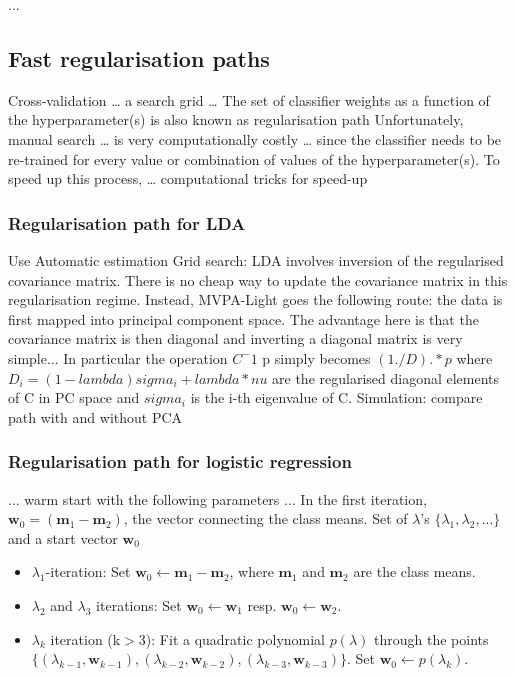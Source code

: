 \documentclass[utf8]{frontiersSCNS} %
\newcommand{\m}{\mathbf{m}}
\newcommand{\w}{\mathbf{w}}
\begin{document}
...


\subsection{Fast regularisation paths}


Cross-validation … a search grid … The set of classifier weights as a function of the hyperparameter(s) is also known as regularisation path
Unfortunately, manual search … is very computationally costly … since the classifier needs to be re-trained for every value or combination of values of the hyperparameter(s). To speed up this process, … computational tricks for speed-up

\subsubsection{Regularisation path for LDA}
Use Automatic estimation
Grid search: LDA involves inversion of the regularised covariance matrix. There is no cheap way to update the covariance matrix in this regularisation regime. Instead, MVPA-Light goes the following route: the data is first mapped into principal component space. The advantage here is that the covariance matrix is then diagonal and inverting a diagonal matrix is very simple... In particular the operation $C^-1$ p simply becomes $(1./D) .* p$ where $D_i = (1-lambda) sigma_i + lambda * nu$ are the regularised diagonal elements of C in PC space and $sigma_i$ is the i-th eigenvalue of C.
Simulation: compare path with and without PCA

\subsubsection{Regularisation path for logistic regression}

... warm start with the following parameters ... In the first iteration, $\w_0 = (\m_1 - \m_2)$, the vector connecting the class means. Set of $\lambda$'s $\{\lambda_1, \lambda_2, ...\}$ and a start vector $\w_0$

\begin{itemize}
\item $\lambda_1$-iteration: Set $\w_0\leftarrow \m_1 - \m_2$, where $\m_1$ and $\m_2$ are the class means.
\item $\lambda_2$ and $\lambda_3$ iterations: Set $\w_0\leftarrow \w_1$ resp. $\w_0\leftarrow \w_2$.
\item $\lambda_k$ iteration (k$>$3): Fit a quadratic polynomial $p(\lambda)$ through the points $\{(\lambda_{k-1},\w_{k-1}), (\lambda_{k-2},\w_{k-2}), (\lambda_{k-3},\w_{k-3})\}$. Set $\w_0 \leftarrow p(\lambda_k)$.
\end{itemize}
\end{document}
